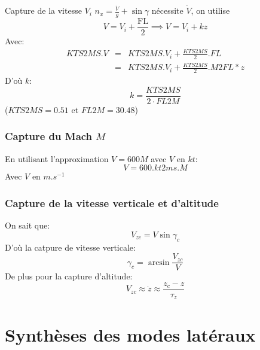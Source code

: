 \documentclass[tikz, footheight=2em]{beamer}
\begin{document}
\begin{frame}{Capture de la vitesse \( V_i \)} \pause{}
    \(n_x = \frac{\dot{V}}{g} + \sin \gamma \) \pause{} n\'ecessite \(\dot{V}\),
    on utilise
    \[
    V = V_i + \frac{\text{FL}}{2} \implies \boxed{V = V_i + k z}
    \]
    Avec:
    \[
    \begin{array}{rcl}
        KTS2MS . V &=& KTS2MS . V_i + \frac{KTS2MS}{2} . FL\\
        &=& KTS2MS . V_i + \frac{KTS2MS}{2} . M2FL * z
    \end{array}
    \] \pause{}
    D'où \( k \):
    \[
    \boxed{
    k = \frac{KTS2MS}{2\cdot FL2M}
    }
    \]
    (\( KTS2MS = 0.51\) et \( FL2M = 30.48\))

\end{frame}

%
%

\begin{frame}
    \frametitle{Capture du Mach \( M \)} \pause{}
    En utilisant l'approximation \( V = 600 M \) avec \( V \) en \( kt \):
    \[
    \boxed{
        V = 600 . kt2ms . M
    }
    \]
    Avec \( V \) en \( m.s^{-1} \)
\end{frame}

\begin{frame}
    \frametitle{Capture de la vitesse verticale et d'altitude } \pause{}
    On sait que:
    \[
    V_{zc} = V \sin \gamma_{c}
    \] \pause{}
    D'où la catpure de vitesse verticale:
    \[
    \boxed{\gamma _c = \arcsin \frac{V_{zc}}{V}}
    \] \pause{}
    De plus pour la capture d'altitude:
    \[
    \boxed{V_{zc} \approx \dot{z}  \approx \frac{z_c - z}{\tau_z}}
    \]
\end{frame}

\section{Synth\`eses des modes lat\'eraux}
\end{document}
